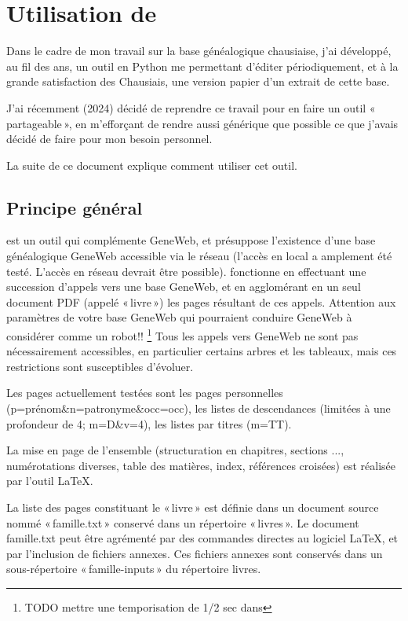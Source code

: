 
\section{Utilisation de \gwtol{}}

Dans le cadre de mon travail sur la base généalogique chausiaise, j'ai développé,
au fil des ans, un outil en Python me permettant d'éditer périodiquement, et
à la grande satisfaction des Chausiais, une version papier d'un extrait de
cette base.

J'ai récemment (2024) décidé de reprendre ce travail pour en faire un outil
«\,partageable\,», en m'efforçant de rendre aussi générique que possible ce que j'avais
décidé de faire pour mon besoin personnel.

La suite de ce document explique comment utiliser cet outil.

\subsection{Principe général}

\gwtol{} est un outil qui complémente GeneWeb, et présuppose l'existence d'une
base généalogique GeneWeb accessible via le réseau (l'accès en local a amplement
été testé. L'accès en réseau devrait être possible).
\gwtol{} fonctionne en effectuant une succession d'appels vers une base GeneWeb,
et en agglomérant en un seul document PDF (appelé «\,livre\,») les pages résultant
de ces appels. Attention aux paramètres de votre base GeneWeb qui pourraient
conduire GeneWeb à considérer \gwtol{} comme un robot!!
\footnote{TODO mettre une temporisation de 1/2 sec dans \gwtol{}}
Tous les appels vers GeneWeb ne sont pas nécessairement accessibles, en
particulier certains arbres et les tableaux, mais ces restrictions sont
susceptibles d'évoluer.

Les pages actuellement testées sont les pages personnelles
(p=prénom\&n=patronyme\&occ=occ), les listes de descendances (limitées à
une profondeur de 4; m=D\&v=4), les listes par titres (m=TT).

La mise en page de l'ensemble (structuration en chapitres, sections ...,
numérotations diverses, table des matières, index, références croisées)
est réalisée par l'outil \LaTeX{}.

La liste des pages constituant le «\,livre\,» est définie dans un document source
nommé «\,famille.txt\,» conservé dans un répertoire «\,livres\,».
Le document famille.txt peut être agrémenté par des commandes directes au
logiciel \LaTeX{}, et par l'inclusion de fichiers annexes. Ces fichiers annexes
sont conservés dans un sous-répertoire «\,famille-inputs\,» du répertoire livres.

